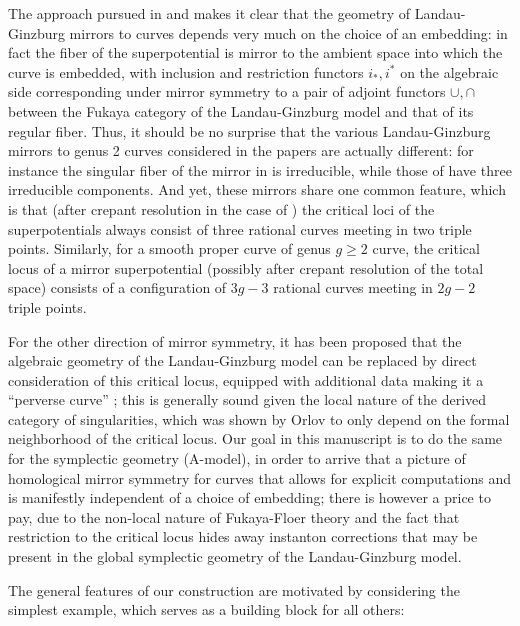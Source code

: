 \documentclass[11pt,leqno]{amsart}
\numberwithin{equation}{section}
\begin{document}
The approach pursued in \cite{AA} and \cite{Cannizzo} makes it
clear that the geometry of Landau-Ginzburg mirrors to curves depends
very much on the choice of an embedding: in fact the fiber of the
superpotential is mirror to the ambient space into which the curve is
embedded, with inclusion and restriction functors $i_*,i^*$ on the algebraic side
corresponding under mirror symmetry to a pair of adjoint functors $\cup,\cap$
between the Fukaya category of the Landau-Ginzburg model and that of its
regular fiber. Thus, it should be no surprise that the various
Landau-Ginzburg mirrors to genus 2 curves considered in the papers
\cite{SeGenus2,GKR,AAK,Cannizzo} are actually different: for instance the singular fiber of the mirror in \cite{Cannizzo}
is irreducible, while those of \cite{GKR,AAK} have three irreducible components.
And yet, these mirrors share one common feature, which is that
(after crepant resolution in the case of \cite{SeGenus2}) the critical
loci of the superpotentials always consist of three rational curves meeting
in two triple points. 
Similarly, for a smooth proper curve of genus $g\geq 2$ curve,
the critical locus of a mirror superpotential (possibly after crepant 
resolution of the total space) consists of a configuration of $3g-3$
rational curves meeting in $2g-2$ triple points. 

For the other direction of mirror symmetry, it has been proposed that the algebraic geometry of the Landau-Ginzburg
model can be replaced by direct consideration of this critical locus,
equipped with additional data making it a ``perverse curve''
\cite{GKR,Ruddat}; this is generally sound given the local nature of the
derived category of singularities, which was shown by Orlov to only depend
on the formal neighborhood of the critical locus. 
Our goal in this manuscript is to do the same for the symplectic geometry
(A-model), in order to arrive that a picture of homological mirror symmetry
for curves that allows for explicit computations and is manifestly
independent of a choice of embedding; there is however a price to pay,
due to the non-local nature of Fukaya-Floer theory and
the fact that restriction to the critical locus hides away instanton
corrections that may be present in the global symplectic geometry of the Landau-Ginzburg
model.

The general features of our construction are motivated by considering
the simplest example, which serves as a building block for all others:
\end{document}
